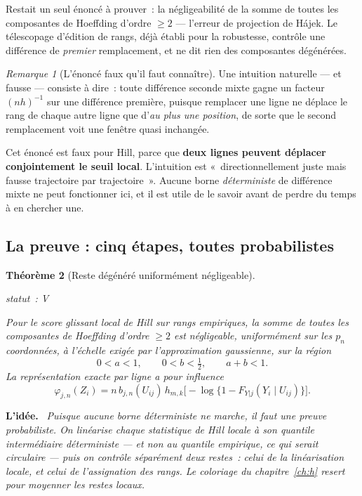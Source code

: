 \documentclass[11pt]{article}
\theoremstyle{plain}
\newtheorem{theoreme}{Théorème}[section]
\theoremstyle{definition}
\theoremstyle{remark}
\newtheorem{remarque}[theoreme]{Remarque}
\newcommand{\1}{\mathbf 1}
\newcommand{\statut}[1]{%
  \nopagebreak\par\nopagebreak
  \hfill{\normalfont\footnotesize\textcolor{gris}{statut~: #1}}%
  \par\nopagebreak\vspace{-2pt}}
\newenvironment{idee}
  {\par\medskip\noindent\textcolor{bleu}{\textbf{L'idée.}}\ \itshape}
  {\par\medskip}
\begin{document}
Restait un seul énoncé à prouver~: la négligeabilité de la somme de
toutes les composantes de Hoeffding d'ordre $\ge2$ --- l'erreur de
projection de Hájek. Le télescopage d'édition de rangs, déjà établi pour
la robustesse, contrôle une différence de \emph{premier} remplacement, et
ne dit rien des composantes dégénérées.

\begin{remarque}[L'énoncé faux qu'il faut connaître]
\label{rem:faux-pas}
Une intuition naturelle --- et fausse --- consiste à dire~: toute
différence seconde mixte gagne un facteur $(nh)^{-1}$ sur une différence
première, puisque remplacer une ligne ne déplace le rang de chaque autre
ligne que d'\emph{au plus une position}, de sorte que le second
remplacement voit une fenêtre quasi inchangée.

Cet énoncé est faux pour Hill, parce que \textbf{deux lignes peuvent
déplacer conjointement le seuil local}. L'intuition est
«~directionnellement juste mais fausse trajectoire par trajectoire~».
Aucune borne \emph{déterministe} de différence mixte ne peut fonctionner
ici, et il est utile de le savoir avant de perdre du temps à en chercher
une.
\end{remarque}

\subsection{La preuve : cinq étapes, toutes probabilistes}

\begin{theoreme}[Reste dégénéré uniformément négligeable]
\label{thm:hajek}
\statut{V}
Pour le score glissant local de Hill sur rangs empiriques, la somme de
toutes les composantes de Hoeffding d'ordre $\ge2$ est négligeable,
uniformément sur les $p_n$ coordonnées, à l'échelle exigée par
l'approximation gaussienne, sur la région
\[
 \boxed{\ 0<a<1,\qquad 0<b<\tfrac12,\qquad a+b<1 .\ }
\]
La représentation exacte par ligne a pour influence
\[
 \varphi_{j,n}(Z_i)=n\,b_{j,n}(U_{ij})\,
   h_{m,k}\bigl[-\log\{1-F_{Y|j}(Y_i\mid U_{ij})\}\bigr].
\]
\end{theoreme}

\begin{idee}
Puisque aucune borne déterministe ne marche, il faut une preuve
probabiliste. On linéarise chaque statistique de Hill locale à son
quantile intermédiaire \emph{déterministe} --- et non au quantile
empirique, ce qui serait circulaire --- puis on contrôle séparément deux
restes~: celui de la linéarisation locale, et celui de l'assignation des
rangs. Le coloriage du chapitre~\ref{ch:h} resert pour moyenner les
restes locaux.
\end{idee}
\end{document}
